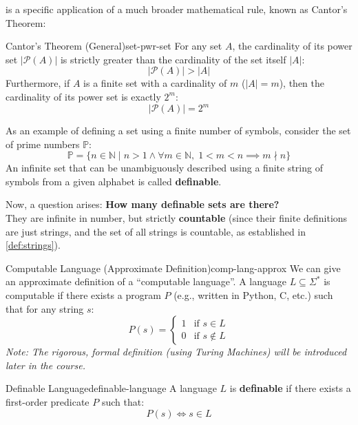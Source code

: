 \noindent {} is a specific application of a much broader mathematical rule, known as Cantor's Theorem:

\begin{theorem}{Cantor's Theorem (General)}{set-pwr-set}
    For any set \(A\), the cardinality of its power set \(|\mathcal{P}(A)|\) is strictly greater than the cardinality of the set itself \(|A|\):
    \[
        |\mathcal{P}(A)| > |A|
    \]
    Furthermore, if \(A\) is a finite set with a cardinality of \(m\) (\(|A| = m\)), then the cardinality of its power set is exactly \(2^m\):
    \[
        |\mathcal{P}(A)| = 2^m
    \]
\end{theorem}

\noindent As an example of defining a set using a finite number of symbols, consider the set of prime numbers \(\mathbb{P}\):
\[
    \mathbb{P} = \{n \in \mathbb{N} \mid n > 1 \land \forall m \in \mathbb{N},\; 1 < m < n \implies m \nmid n\}
\]
An infinite set that can be unambiguously described using a finite string of symbols from a given alphabet is called \textbf{definable}.

\noindent Now, a question arises: \textbf{How many definable sets are there?} \\
They are infinite in number, but strictly \textbf{countable} (since their finite definitions are just strings, and the set of all strings is countable, as established in \cref{def:strings}).

\begin{concept}{Computable Language (Approximate Definition)}{comp-lang-approx}
    We can give an approximate definition of a ``computable language''. A language \(L \subseteq \Sigma^*\) is computable if there exists a program \(P\) (e.g., written in Python, C, etc.) such that for any string \(s\):
    \[
        P(s) = \begin{cases}
            1 & \text{if } s \in L \\
            0 & \text{if } s \notin L
        \end{cases}
    \]
    \textit{Note: The rigorous, formal definition (using Turing Machines) will be introduced later in the course.}
\end{concept}

\begin{definition}{Definable Language}{definable-language}
    A language \(L\) is \textbf{definable} if there exists a first-order predicate \(P\) such that:
    \[
        P(s) \iff s \in L
    \]
\end{definition}

